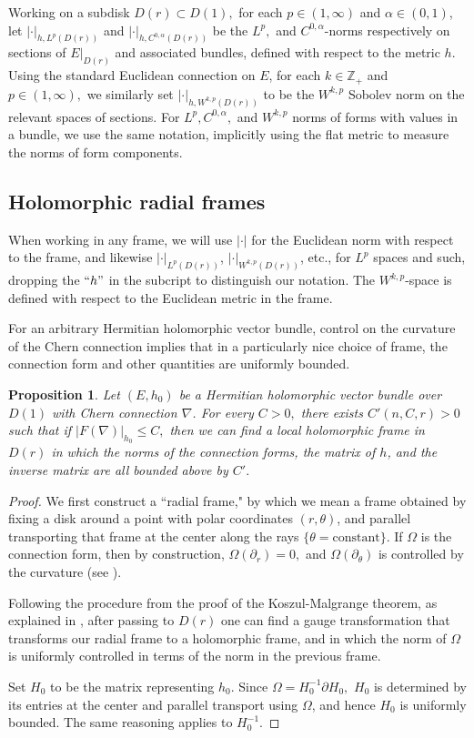 \documentclass[10pt]{amsart}
\newtheorem{prop}[thm]{Proposition}
\theoremstyle{definition}
\begin{document}
Working on a subdisk $D(r)\subset D(1),$ for each $p\in (1,\infty)$ and $\alpha\in (0,1)$, let $|\cdot|_{h,L^p(D(r))}$ and  $|\cdot|_{h,C^{0,\alpha}(D(r))}$ be the $L^p,$ and $C^{0,\alpha}$-norms respectively on sections of $E|_{D(r)}$ and associated bundles, defined with respect to the metric $h$. Using the standard Euclidean connection on $E$, for each $k\in\mathbb{Z}_+$ and $p\in (1,\infty),$ we similarly set $|\cdot|_{h,W^{k,p}(D(r))}$ to be the $W^{k,p}$ Sobolev norm on the relevant spaces of sections. For $L^p, C^{0,\alpha},$ and $W^{k,p}$ norms of forms with values in a bundle, we use the same notation, implicitly using the flat metric to measure the norms of form components. 


\subsection{Holomorphic radial frames}
When working in any frame, we will use $|\cdot|$ for the Euclidean norm with respect to the frame, and likewise $|\cdot|_{L^p(D(r))}$, $|\cdot|_{W^{k,p}(D(r))}$, etc., for $L^p$ spaces and such, dropping the $``h"$ in the subcript to distinguish our notation. The $W^{k,p}$-space is defined with respect to the Euclidean metric in the frame. 

For an arbitrary Hermitian holomorphic vector bundle, control on the curvature of the Chern connection implies that in a particularly nice choice of frame, the connection form and other quantities are uniformly bounded.
\begin{prop}\label{prop:boundinframes}
    Let $(E,h_0)$ be a Hermitian holomorphic vector bundle over $D(1)$ with Chern connection $\nabla$. For every $C>0,$ there exists $C'(n,C,r)>0$ such that if $|F(\nabla)|_{h_0}\leq C,$ then we can find a local holomorphic frame in $D(r)$ in which the norms of the connection forms, the matrix of $h$, and the inverse matrix are all bounded above by $C'.$
\end{prop}
\begin{proof}
We first construct a ``radial frame," by which we mean a frame obtained by fixing a disk around a point with polar coordinates $(r,\theta)$, and parallel transporting that frame at the center along the rays $\{\theta =\textrm{constant}\}.$ If $\Omega$ is the connection form, then by construction, $\Omega(\partial_r)=0,$ and $\Omega(\partial_\theta)$ is controlled by the curvature (see \cite[section 2.2.1]{DK}).

 Following the procedure from the proof of the Koszul-Malgrange theorem, as explained in \cite[section 2.2.1]{DK}, after passing to $D(r)$ one can find a gauge transformation that transforms our radial frame to a holomorphic frame, and in which the norm of $\Omega$ is uniformly controlled in terms of the norm in the previous frame. 
 
 Set $H_0$ to be the matrix representing $h_0$. Since $\Omega=H_0^{-1}\partial H_0,$ $H_0$ is determined by its entries at the center and parallel transport using $\Omega$, and hence $H_0$ is uniformly bounded.  The same reasoning applies to $H_0^{-1}.$ 
\end{proof}
\end{document}

